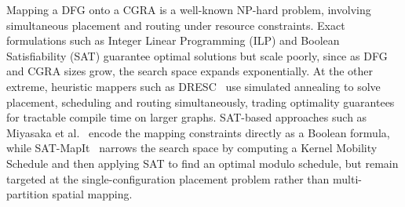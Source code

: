 \documentclass[10pt]{article}
\begin{document}
 

Mapping a DFG onto a CGRA is a well-known NP-hard problem, involving simultaneous placement and routing under resource constraints. Exact formulations such as Integer Linear Programming (ILP) and Boolean Satisfiability (SAT) guarantee optimal solutions but scale poorly, since as DFG and CGRA sizes grow, the search space expands exponentially. At the other extreme, heuristic mappers such as DRESC~\cite{mei2003dresc} use simulated annealing to solve placement, scheduling and routing simultaneously, trading optimality guarantees for tractable compile time on larger graphs. SAT-based approaches such as Miyasaka et al.~\cite{miyasaka2020sat} encode the mapping constraints directly as a Boolean formula, while SAT-MapIt~\cite{satmapit2023} narrows the search space by computing a Kernel Mobility Schedule and then applying SAT to find an optimal modulo schedule, but remain targeted at the single-configuration placement problem rather than multi-partition spatial mapping.
\end{document}
